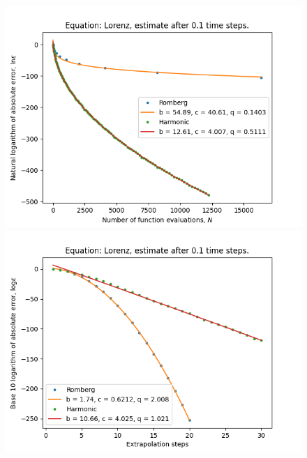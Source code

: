 \begin{figure}[H]
\centering
\begin{minipage}{0.45\textwidth}
\centering
\includegraphics[scale=0.45]{emr_plots/lorenz_hp_trend.png}
\end{minipage}
\begin{minipage}{0.45\textwidth}
\centering
\includegraphics[scale=0.45]{emr_plots/lorenz_hp_steps.png}
\end{minipage}
\end{figure}

